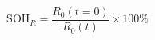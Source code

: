 \documentclass[preview]{standalone}
\begin{document}
\[\text{SOH}_R = \frac{R_0(t=0)}{R_0(t)} \times 100\% \tag{3.9}\]
\end{document}
